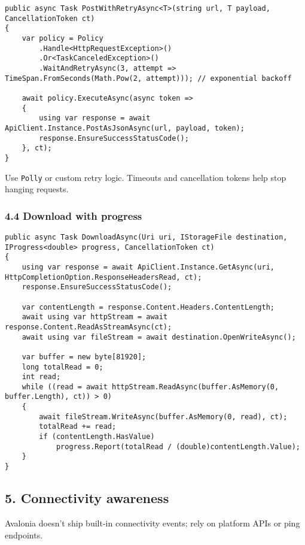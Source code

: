 \begin{lstlisting}
public async Task PostWithRetryAsync<T>(string url, T payload, CancellationToken ct)
{
    var policy = Policy
        .Handle<HttpRequestException>()
        .Or<TaskCanceledException>()
        .WaitAndRetryAsync(3, attempt => TimeSpan.FromSeconds(Math.Pow(2, attempt))); // exponential backoff

    await policy.ExecuteAsync(async token =>
    {
        using var response = await ApiClient.Instance.PostAsJsonAsync(url, payload, token);
        response.EnsureSuccessStatusCode();
    }, ct);
}
\end{lstlisting}

Use \passthrough{\lstinline!Polly!} or custom retry logic. Timeouts and
cancellation tokens help stop hanging requests.

\subsubsection{4.4 Download with progress}\label{download-with-progress}

\begin{lstlisting}
public async Task DownloadAsync(Uri uri, IStorageFile destination, IProgress<double> progress, CancellationToken ct)
{
    using var response = await ApiClient.Instance.GetAsync(uri, HttpCompletionOption.ResponseHeadersRead, ct);
    response.EnsureSuccessStatusCode();

    var contentLength = response.Content.Headers.ContentLength;
    await using var httpStream = await response.Content.ReadAsStreamAsync(ct);
    await using var fileStream = await destination.OpenWriteAsync();

    var buffer = new byte[81920];
    long totalRead = 0;
    int read;
    while ((read = await httpStream.ReadAsync(buffer.AsMemory(0, buffer.Length), ct)) > 0)
    {
        await fileStream.WriteAsync(buffer.AsMemory(0, read), ct);
        totalRead += read;
        if (contentLength.HasValue)
            progress.Report(totalRead / (double)contentLength.Value);
    }
}
\end{lstlisting}

\subsection{5. Connectivity awareness}\label{connectivity-awareness}

Avalonia doesn't ship built-in connectivity events; rely on platform
APIs or ping endpoints.

